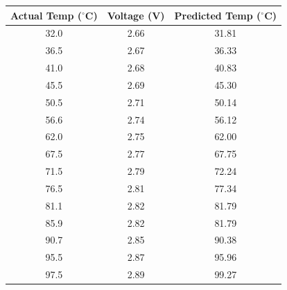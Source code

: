 \begin{tabular}{|c|c|c|}
    \hline
    \textbf{Actual Temp ($^{\circ}$C)} & \textbf{Voltage (V)} & \textbf{Predicted Temp ($^{\circ}$C)} \\
    \hline
    32.0 & 2.66 & 31.81 \\
    \hline
    36.5 & 2.67 & 36.33 \\
    \hline
    41.0 & 2.68 & 40.83 \\
    \hline
    45.5 & 2.69 & 45.30 \\
    \hline
    50.5 & 2.71 & 50.14 \\
    \hline
    56.6 & 2.74 & 56.12 \\
    \hline
    62.0 & 2.75 & 62.00 \\
    \hline
    67.5 & 2.77 & 67.75 \\
    \hline
    71.5 & 2.79 & 72.24 \\
    \hline
    76.5 & 2.81 & 77.34 \\
    \hline
    81.1 & 2.82 & 81.79 \\
    \hline
    85.9 & 2.82 & 81.79 \\
    \hline
    90.7 & 2.85 & 90.38 \\
    \hline
    95.5 & 2.87 & 95.96 \\
    \hline
    97.5 & 2.89 & 99.27 \\
    \hline
\end{tabular}
